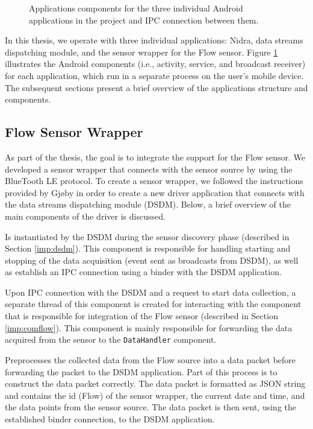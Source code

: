 \begin{figure}
    \caption{Applications components for the three individual Android applications in the project and IPC connection between them.}
    \label{fig:app_components}
\end{figure}


In this thesis, we operate with three individual applications: Nidra, data streams dispatching module, and the sensor wrapper for the Flow sensor. Figure \ref{fig:app_components} illustrates the Android components (i.e., activity, service, and broadcast receiver) for each application, which run in a separate process on the user's mobile device. The subsequent sections present a brief overview of the applications structure and components.


\subsection{Flow Sensor Wrapper}\label{imp:flowsensor}
As part of the thesis, the goal is to integrate the support for the Flow sensor. We developed a sensor wrapper that connects with the sensor source by using the BlueTooth LE protocol. To create a sensor wrapper, we followed the instructions provided by Gjøby in order to create a new driver application that connects with the data streams dispatching module (DSDM). Below, a brief overview of the main components of the driver is discussed.

\begin{description}[font=\normalfont\itshape]
    \item[WrapperService:] Is instantiated by the DSDM during the sensor discovery phase (described in Section \ref{imp:dsdm}). This component is responsible for handling starting and stopping of the data acquisition (event sent as broadcasts from DSDM), as well as establish an IPC connection using a binder with the DSDM application. 
    \item[CommunicationHandler:] Upon IPC connection with the DSDM and a request to start data collection, a separate thread of this component is created for interacting with the component that is responsible for integration of the Flow sensor (described in Section \ref{imp:comflow}). This component is mainly responsible for forwarding the data acquired from the sensor to the \verb|DataHandler| component. 
    \item[DataHandler:] Preprocesses the collected data from the Flow source into a data packet before forwarding the packet to the DSDM application. Part of this process is to construct the data packet correctly. The data packet is formatted as JSON string and contains the id (Flow) of the sensor wrapper, the current date and time, and the data points from the sensor source. The data packet is then sent, using the established binder connection, to the DSDM application.
\end{description}

